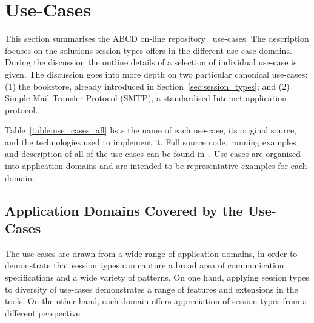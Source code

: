 
\section{Use-Cases}
\label{sec:usecases}

This section summarises the ABCD on-line
repository~\cite{usecase_repository} use-cases.
The description focuses on the
solutions session types offers in the different 
use-case domains. During the discussion
the outline details of a selection of individual
use-case is given. The discussion goes
into more depth on two particular canonical
use-cases:
(1) the bookstore, %
already introduced
in Section~\ref{sec:session_types};
and
(2) Simple Mail Transfer Protocol (SMTP),
a standardised Internet application protocol.

Table~\ref{table:use_cases_all} lists the name of each use-case,
its original source, and the technologies
used to implement it. Full source code, running examples and %
description of all of the use-cases can be found in~\cite{usecase_repository}. 
Use-cases are organised into application domains and are intended
to be representative examples for each domain.

\subsection{Application Domains Covered by the Use-Cases}

The use-cases are drawn from a wide range of
application domains, in order to demonstrate that
session types can capture a broad area of communication
specifications and a wide variety of patterns.
On  one hand, applying session types to diversity of use-cases
demonstrates a range of features and extensions in the tools. 
%
On the other  hand, each domain offers appreciation
of session types from a different perspective.


